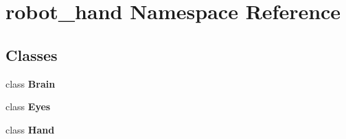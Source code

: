 \section{robot\-\_\-hand Namespace Reference}
\label{namespacerobot__hand}
\subsection*{Classes}
\begin{DoxyCompactItemize}
\item 
class {\bf Brain}
\item 
class {\bf Eyes}
\item 
class {\bf Hand}
\end{DoxyCompactItemize}
